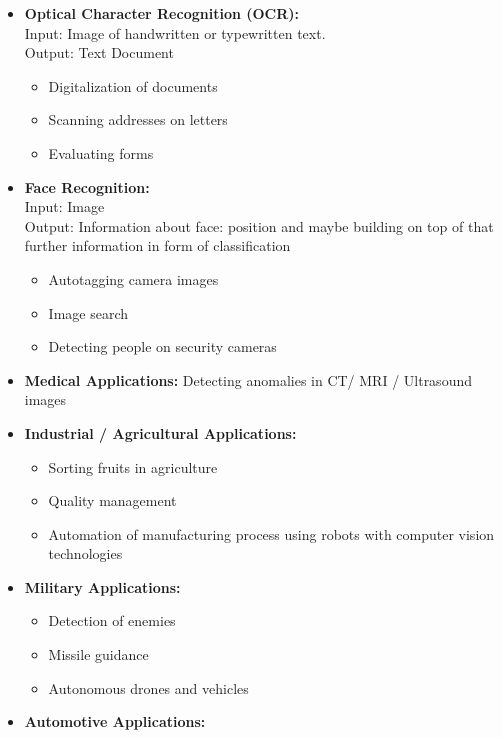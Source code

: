 \begin{itemize}
    \item \textbf{Optical Character Recognition (OCR):}
          \\Input: Image of handwritten or typewritten text.\\
          Output: Text Document
          \begin{itemize}
              \item Digitalization of documents
              \item Scanning addresses on letters
              \item Evaluating forms
          \end{itemize}
    \item \textbf{Face Recognition:}\\
          Input: Image\\
          Output: Information about face: position and maybe building on top of that further information in form of classification
          \begin{itemize}
              \item Autotagging camera images
              \item Image search
              \item Detecting people on security cameras
          \end{itemize}
    \item \textbf{Medical Applications:} Detecting anomalies in CT/ MRI / Ultrasound images
    \item \textbf{Industrial / Agricultural Applications:}
          \begin{itemize}
              \item Sorting fruits in agriculture
              \item Quality management
              \item Automation of manufacturing process using robots with computer vision technologies
          \end{itemize}
    \item \textbf{Military Applications:}
          \begin{itemize}
              \item Detection of enemies
              \item Missile guidance
              \item Autonomous drones and vehicles
          \end{itemize}
    \item \textbf{Automotive Applications:}

\end{itemize}
